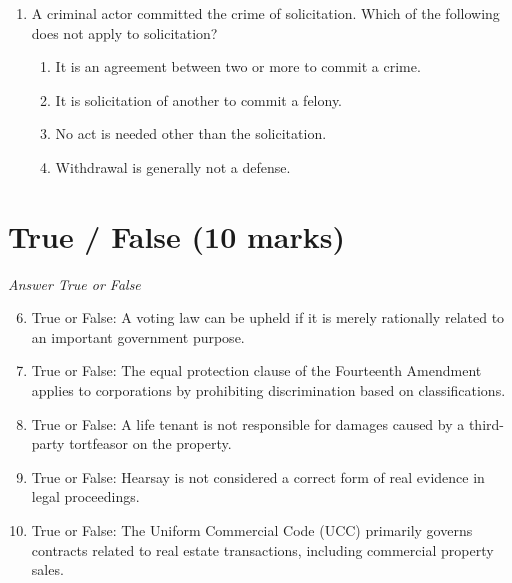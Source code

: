 \documentclass[12pt]{article}
\begin{document}
\begin{enumerate}[label=\arabic*.]
\begin{enumerate}[label=(\alph*)]
    \item interpretation of treaties
    \item interpretation of admiralty laws
    \item disputes between states and foreign citizens
    \item all of the above
\end{enumerate}
\item A criminal actor committed the crime of solicitation. Which of the following does not apply to solicitation?
\begin{enumerate}[label=(\alph*)]
    \item It is an agreement between two or more to commit a crime.
    \item It is solicitation of another to commit a felony.
    \item No act is needed other than the solicitation.
    \item Withdrawal is generally not a defense.
\end{enumerate}
\end{enumerate}

\section*{True / False (10 marks)}
\textit{Answer True or False}
\begin{enumerate}[label=\arabic*.]
\setcounter{enumi}{5}
\item True or False: A voting law can be upheld if it is merely rationally related to an important government purpose.
\item True or False: The equal protection clause of the Fourteenth Amendment applies to corporations by prohibiting discrimination based on classifications.
\item True or False: A life tenant is not responsible for damages caused by a third-party tortfeasor on the property.
\item True or False: Hearsay is not considered a correct form of real evidence in legal proceedings.
\item True or False: The Uniform Commercial Code (UCC) primarily governs contracts related to real estate transactions, including commercial property sales.
\end{enumerate}
\end{document}
